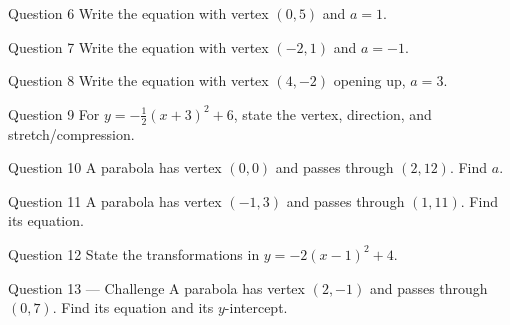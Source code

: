 \documentclass[11pt]{article}
\begin{document}
\begin{qbox}{Question 6}
Write the equation with vertex $(0,5)$ and $a=1$.\workspace{1.8cm}
\end{qbox}

\begin{qbox}{Question 7}
Write the equation with vertex $(-2,1)$ and $a=-1$.\workspace{1.8cm}
\end{qbox}

\begin{qbox}{Question 8}
Write the equation with vertex $(4,-2)$ opening up, $a=3$.\workspace{1.8cm}
\end{qbox}

\begin{qbox}{Question 9}
For $y=-\tfrac12(x+3)^2+6$, state the vertex, direction, and stretch/compression.\workspace{2.2cm}
\end{qbox}

\begin{qbox}{Question 10}
A parabola has vertex $(0,0)$ and passes through $(2,12)$. Find $a$.\workspace{2.2cm}
\end{qbox}

\begin{qbox}{Question 11}
A parabola has vertex $(-1,3)$ and passes through $(1,11)$. Find its equation.\workspace{2.4cm}
\end{qbox}

\begin{qbox}{Question 12}
State the transformations in $y=-2(x-1)^2+4$.\workspace{2.2cm}
\end{qbox}

\begin{qbox}{Question 13 --- Challenge}
A parabola has vertex $(2,-1)$ and passes through $(0,7)$. Find its equation and its $y$-intercept.\workspace{3.0cm}
\end{qbox}

\clearpage
{}
\end{document}
